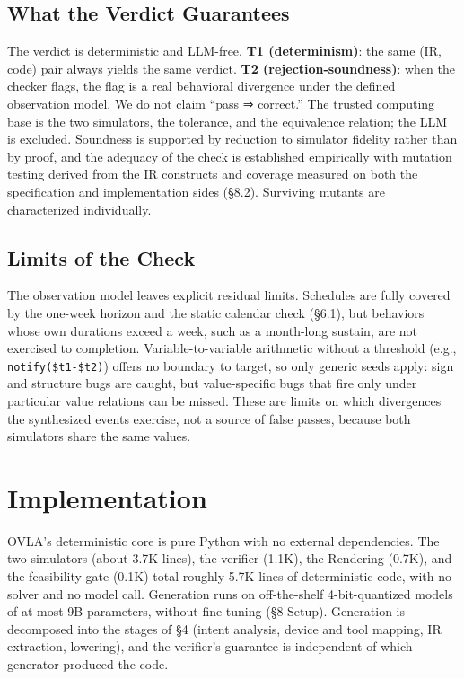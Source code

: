 \documentclass[sigconf,nonacm,anonymous,review]{acmart}
\begin{document}
\subsection{What the Verdict Guarantees}

The verdict is deterministic and LLM-free. \textbf{T1 (determinism)}: the same (IR, code) pair always yields the same verdict. \textbf{T2 (rejection-soundness)}: when the checker flags, the flag is a real behavioral divergence under the defined observation model. We do not claim ``pass ⇒ correct.'' The trusted computing base is the two simulators, the tolerance, and the equivalence relation; the LLM is excluded. Soundness is supported by reduction to simulator fidelity rather than by proof, and the adequacy of the check is established empirically with mutation testing derived from the IR constructs and coverage measured on both the specification and implementation sides (\S8.2). Surviving mutants are characterized individually.

\subsection{Limits of the Check}

The observation model leaves explicit residual limits. Schedules are fully covered by the one-week horizon and the static calendar check (\S6.1), but behaviors whose own durations exceed a week, such as a month-long sustain, are not exercised to completion. Variable-to-variable arithmetic without a threshold (e.g., \texttt{notify(\$t1-\$t2)}) offers no boundary to target, so only generic seeds apply: sign and structure bugs are caught, but value-specific bugs that fire only under particular value relations can be missed. These are limits on which divergences the synthesized events exercise, not a source of false passes, because both simulators share the same values.

\section{Implementation}

OVLA's deterministic core is pure Python with no external dependencies. The two simulators (about 3.7K lines), the verifier (1.1K), the Rendering (0.7K), and the feasibility gate (0.1K) total roughly 5.7K lines of deterministic code, with no solver and no model call. Generation runs on off-the-shelf 4-bit-quantized models of at most 9B parameters, without fine-tuning (\S8 Setup). Generation is decomposed into the stages of \S4 (intent analysis, device and tool mapping, IR extraction, lowering), and the verifier's guarantee is independent of which generator produced the code.
\end{document}
